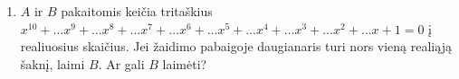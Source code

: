 \begin{enumerate}

  \item $A$ ir $B$ pakaitomis keičia tritaškius $x^{10}+\dots x^9+\dots x^8+\dots
    x^7+\dots x^6+\dots x^5+\dots x^4+\dots x^3+\dots x^2+\dots x+1=0$ į
    realiuosius skaičius. Jei žaidimo pabaigoje daugianaris turi nors vieną
    realiąją šaknį, laimi $B$. Ar gali $B$ laimėti?


\end{enumerate}
